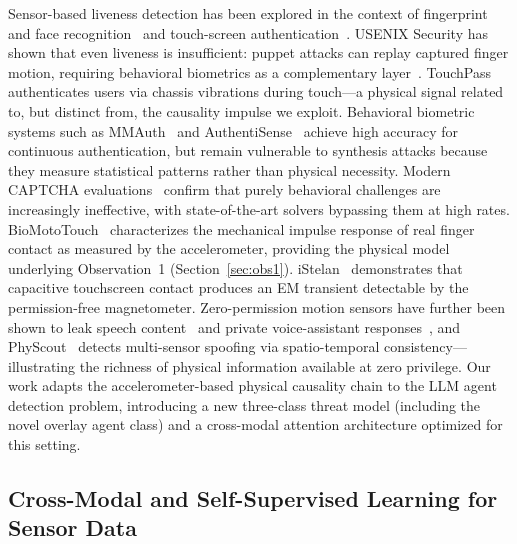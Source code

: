 Sensor-based liveness detection has been explored in the context of fingerprint and
face recognition~\cite{sensorliveness2023} and touch-screen authentication~\cite{touchauth2020}.%
USENIX Security has shown that even liveness is insufficient: puppet attacks can replay
captured finger motion, requiring behavioral biometrics as a complementary
layer~\cite{livenessnotenough2020}.%
TouchPass~\cite{touchpass2020} authenticates users via chassis vibrations during
touch---a physical signal related to, but distinct from, the causality impulse we exploit.%
Behavioral biometric systems such as MMAuth~\cite{mmauth2022} and
AuthentiSense~\cite{authentisense2023} achieve high accuracy for continuous
authentication, but remain vulnerable to synthesis attacks because they measure
statistical patterns rather than physical necessity.%
Modern CAPTCHA evaluations~\cite{captchastudy2023} confirm that purely behavioral
challenges are increasingly ineffective, with state-of-the-art solvers bypassing
them at high rates.%
BioMotoTouch~\cite{biomotouch2026} characterizes the mechanical impulse response of
real finger contact as measured by the accelerometer, providing the physical model
underlying Observation~1 (Section~\ref{sec:obs1}).%
iStelan~\cite{istelan2023} demonstrates that capacitive touchscreen contact produces
an EM transient detectable by the permission-free magnetometer.%
Zero-permission motion sensors have further been shown to leak speech
content~\cite{accear2022} and private voice-assistant responses~\cite{stealthyimu2023},
and PhyScout~\cite{physcout2024} detects multi-sensor spoofing via spatio-temporal
consistency---illustrating the richness of physical information available at zero
privilege.%
Our work adapts the accelerometer-based physical causality chain to the LLM agent
detection problem, introducing a new three-class threat model (including the novel
overlay agent class) and a cross-modal attention architecture optimized for this setting.%

\subsection{Cross-Modal and Self-Supervised Learning for Sensor Data}
\label{sec:rw_ml}

